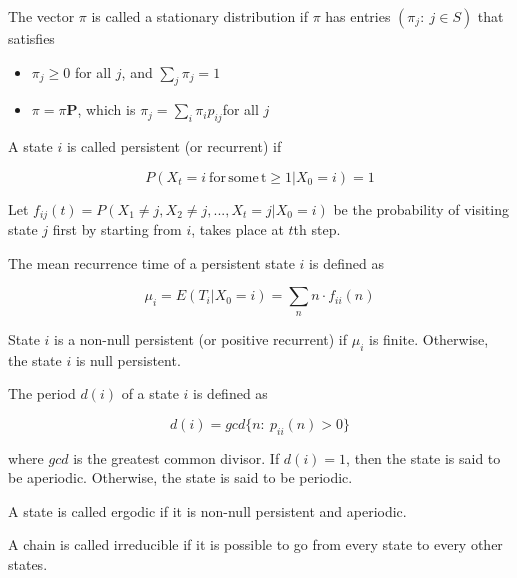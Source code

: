 \begin{defn}
\citep[p.227]{grimmett2001probability} The vector $\pi$ is called
a stationary distribution if $\pi$ has entries $(\pi_{j}:\:j\in S)$
that satisfies
\begin{itemize}
\item $\pi_{j}\geq0$ for all $j$, and $\sum_{j}\pi_{j}=1$
\item $\pi=\pi\mathbf{P}$, which is $\pi_{j}=\sum_{i}\pi_{i}p_{ij}$for
all $j$
\end{itemize}
\end{defn}

\begin{defn}
\citep[p.220]{grimmett2001probability} A state $i$ is called persistent
(or recurrent) if

\[
P(X_{t}=i\mathrm{\:for\,}\mathrm{some\,\mathrm{t}}\geq1|X_{0}=i)=1
\]
\end{defn}

Let $f_{ij}(t)=P(X_{1}\neq j,X_{2}\neq j,...,X_{t}=j|X_{0}=i)$ be
the probability of visiting state $j$ first by starting from $i$,
takes place at $t$th step.

\begin{defn}
\citep[p.222]{grimmett2001probability} The mean recurrence time of
a persistent state $i$ is defined as

\[
\mu_{i}=E(T_{i}|X_{0}=i)=\sum_{n}n\cdot f_{ii}(n)
\]

State $i$ is a non-null persistent (or positive recurrent) if $\mu_{i}$
is finite. Otherwise, the state $i$ is null persistent. 
\end{defn}

\begin{defn}
\citep[p.222]{grimmett2001probability} The period $d(i)$ of a state
$i$ is defined as 

\[
d(i)=gcd\{n:\:p_{ii}(n)>0\}
\]

where $gcd$ is the greatest common divisor. If $d(i)=1$, then the
state is said to be aperiodic. Otherwise, the state is said to be
periodic. 
\end{defn}

\begin{defn}
\citep[p.222]{grimmett2001probability} A state is called ergodic
if it is non-null persistent and aperiodic.
\end{defn}

\begin{defn}
A chain is called irreducible if it is possible to go from every state
to every other states.
\end{defn}

